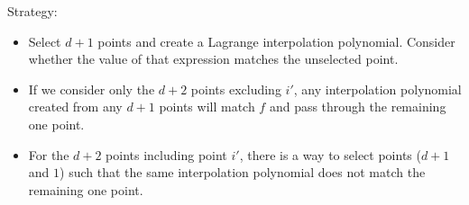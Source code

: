 \begin{versionbeta}
Strategy:
\begin{itemize}
\setlength{\itemsep}{0pt}
\item Select $d+1$ points and create a Lagrange interpolation polynomial. Consider whether the value of that expression matches the unselected point.
\item If we consider only the $d+2$ points excluding $i'$, any interpolation polynomial created from any $d+1$ points will match $f$ and pass through the remaining one point.
\item For the $d+2$ points including point $i'$, there is a way to select points ($d+1$ and $1$) such that the same interpolation polynomial does not match the remaining one point.
\end{itemize}


\end{versionbeta}
